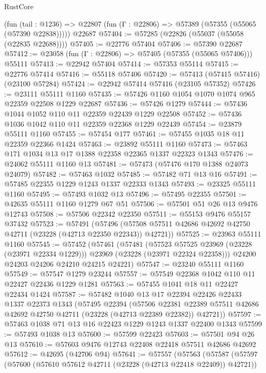\begin{lexlean}{RustCore}
\begin{coremodule}
    (fun (tail : @1236) => @22807 (fun (Γ : @22806) => @57389 (@57355 (@55065 (@57390 @22838)))))
    @22687
@57404 := @57285 (@22826 (@55037 (@55058 (@22835 @22688))))
@57405 := @22776 @57404
@57406 := @57390 @22687
@57412 := @23058 (fun (Γ : @22806) => @57405 (@57355 (@55065 @57406))) @55111
@57413 := @22942 @57404
@57414 := @57353 @55114
@57415 := @22776 @57414
@57416 := @55118 @57406
@57420 := @57413 (@57415 @57416) (@23100 @57284)
@57424 := @22942 @57414 @57416 (@23105 @57352)
@57426 := @23111 @55111 @1160
@57435 := @57426 @1160 @1054 @1070 @1074 @965 @22359 @22508 @1229 @22687
@57436 := @57426 @1279
@57444 := @57436 @1044 @1052 @110 @11 @22359 @22439 @1229 @22508
@57452 := @57436 @1036 @1042 @110 @11 @22359 @22368 @1229 @22439
@57454 := @23879 @55111 @1160
@57455 := @57454 @177
@57461 := @57455 @1035 @18 @11 @22359 @22366 @1424
@57463 := @23892 @55111 @1160
@57473 := @57463 @171 @1034 @13 @17 @1388 @22358 @22365 @1337 @22323 @1343
@57476 := @24062 @55111 @1160 @13
@57481 := @57473 (@57476 @170 @1388 @24073 @24079)
@57482 := @57463 @1032
@57485 := @57482 @71 @13 @16
@57491 := @57485 @22355 @1229 @1243 @1337 @22333 @1343
@57493 := @23325 @55111 @1160
@57495 := @57493 @1032 @13
@57496 := @57495 @22355
@57501 := @42635 @55111 @1160 @1279 @67 @51
@57506 := @57501 @51 @26 @13 @9476 @12743
@57508 := @57506 @22342 @22350
@57511 := @55153 @9476 @55157 @37432
@57523 := @57491
    (@57496 (@57508 @57511 @42686 @42692 @42750 @42711 (@23228 (@42713 @22350 @22343)) @42721))
@57525 := @23963 @55111 @1160
@57545 := @57452
    (@57461
      (@57481
        (@57523 @57525 @23969 (@23228 (@23971 @22334 @1229)))
        @23969
        (@23228 (@23971 @22324 @22358)))
      @24200
      @24203
      @24206
      @24210
      @24215
      @24221)
@57547 := @23240 @55111 @1160
@57549 := @57547 @1279 @23244
@57557 := @57549 @22368 @1042 @110 @11 @22427 @22436 @1229 @1281
@57563 := @57455 @1041 @18 @11 @22427 @22434 @1424
@57587 := @57482
    @1040
    @13
    @17
    @22394
    @22426
    @22433
    @1337
    @22373
    @1343
    (@57495
      @22394
      (@57506
        @22381
        @22389
        @57511
        @42686
        @42692
        @42750
        @42711
        (@23228 (@42713 @22389 @22382))
        @42721))
@57597 := @57463 @1038 @71 @13 @16 @22423 @1229 @1243 @1337 @22400 @1343
@57599 := @57493 @1038 @13
@57600 := @57599 @22423
@57603 := @57501 @94 @26 @13
@57610 := @57603 @9476 @12743 @22408 @22418 @57511 @42686 @42692
@57612 := @42695 (@42706 @94)
@57641 := @57557
    (@57563
      (@57587
        (@57597
          (@57600 (@57610 @57612 @42711 (@23228 (@42713 @22418 @22409)) @42721))

\end{coremodule}
\end{lexlean}
